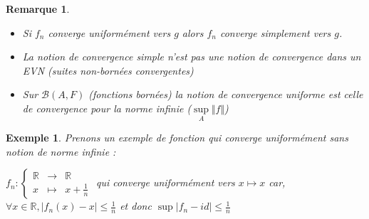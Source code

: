 \documentclass[a4paper,12pt]{book}
\newtheorem{Exe}{Exemple}[section]
\newtheorem{Rem}{Remarque}[section]
\def\R{\mathbb{R}}
\begin{document}
\begin{Rem}\begin{itemize}
\item Si $f_n$ converge uniformément vers $g$ alors $f_n$ converge simplement vers $g$.
\item La notion de convergence simple n'est pas une notion de convergence dans un EVN (suites non-bornées convergentes)
\item Sur $\mathcal{B}(A,F)$ (fonctions bornées) la notion de convergence uniforme est celle de convergence pour la norme infinie ($\sup\limits_A\Vert f\Vert$)
\end{itemize}\end{Rem}
\begin{Exe}
Prenons un exemple de fonction qui converge uniformément sans notion de norme infinie : 
\par $f_n:\left\{\begin{array}{rcl} \R & \to & \R \\ x & \mapsto & x+\frac{1}{n}\end{array}\right.$ qui converge uniformément vers $x\mapsto x$ car, $\forall x\in\R, \vert f_n(x)-x\vert\leq \frac{1}{n}$ et donc $\sup\vert f_n-id\vert\leq\frac{1}{n}$
\end{Exe}
\end{document}
